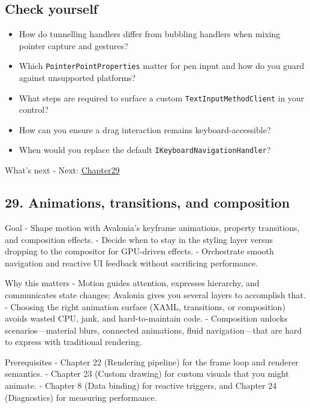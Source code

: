 \subsection{Check yourself}\label{check-yourself-26}

\begin{itemize}
\tightlist
\item
  How do tunnelling handlers differ from bubbling handlers when mixing
  pointer capture and gestures?
\item
  Which \passthrough{\lstinline!PointerPointProperties!} matter for pen
  input and how do you guard against unsupported platforms?
\item
  What steps are required to surface a custom
  \passthrough{\lstinline!TextInputMethodClient!} in your control?
\item
  How can you ensure a drag interaction remains keyboard-accessible?
\item
  When would you replace the default
  \passthrough{\lstinline!IKeyboardNavigationHandler!}?
\end{itemize}

What's next - Next: \href{Chapter29.md}{Chapter29}

\newpage

\subsection{29. Animations, transitions, and
composition}\label{animations-transitions-and-composition}

Goal - Shape motion with Avalonia's keyframe animations, property
transitions, and composition effects. - Decide when to stay in the
styling layer versus dropping to the compositor for GPU-driven effects.
- Orchestrate smooth navigation and reactive UI feedback without
sacrificing performance.

Why this matters - Motion guides attention, expresses hierarchy, and
communicates state changes; Avalonia gives you several layers to
accomplish that. - Choosing the right animation surface (XAML,
transitions, or composition) avoids wasted CPU, jank, and
hard-to-maintain code. - Composition unlocks scenarios---material blurs,
connected animations, fluid navigation---that are hard to express with
traditional rendering.

Prerequisites - Chapter 22 (Rendering pipeline) for the frame loop and
renderer semantics. - Chapter 23 (Custom drawing) for custom visuals
that you might animate. - Chapter 8 (Data binding) for reactive
triggers, and Chapter 24 (Diagnostics) for measuring performance.

